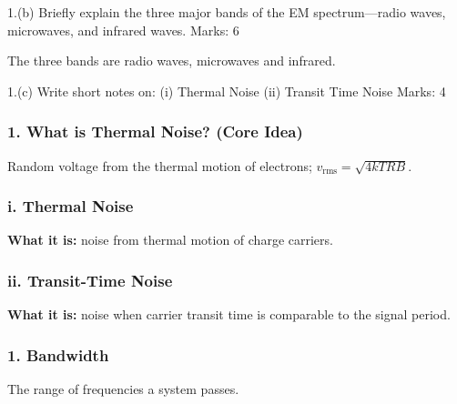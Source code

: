 \label{sec:1b_major_bands_of_the_em_spectrum}

\begin{questionblock}{1.(b) Briefly explain the three major bands of the EM spectrum---radio waves, microwaves, and infrared waves. Marks: 6}

\answer

The three bands are radio waves, microwaves and infrared.

\end{questionblock}

\label{sec:1c_thermal_noise_and_transit_time_noise}

\begin{questionblock}{1.(c) Write short notes on: (i) Thermal Noise (ii) Transit Time Noise Marks: 4}

\theory

\subsubsection*{1. What is Thermal Noise? (Core Idea)}

Random voltage from the thermal motion of electrons; $v_{\text{rms}} = \sqrt{4kTRB}$.

\answer

\subsubsection*{i. Thermal Noise}

\textbf{What it is:} noise from thermal motion of charge carriers.

\subsubsection*{ii. Transit-Time Noise}

\textbf{What it is:} noise when carrier transit time is comparable to the signal period.

\keyword

\subsubsection*{1. Bandwidth}

The range of frequencies a system passes.

\end{questionblock}

